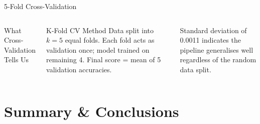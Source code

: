 \documentclass[aspectratio=169,11pt]{beamer}
\begin{document}
\begin{frame}{5-Fold Cross-Validation}
\begin{columns}[T]
\begin{block}{What Cross-Validation Tells Us}
    \end{block}
    \vspace{-0.3cm}
    \begin{exampleblock}{K-Fold CV Method}
      \footnotesize
      Data split into $k{=}5$ equal folds. Each fold acts as validation once; model trained on remaining 4. Final score = mean of 5 validation accuracies.
    \end{exampleblock}
    \vspace{-0.2cm}
    \begin{tcolorbox}[colback=greencol!8,colframe=greencol,fonttitle=\footnotesize\bfseries,title=Stability Confirmed]
      \footnotesize
      Standard deviation of 0.0011 indicates the pipeline generalises well regardless of the random data split.
    \end{tcolorbox}
\end{columns}
\end{frame}
\section{Summary \& Conclusions}
\end{document}
